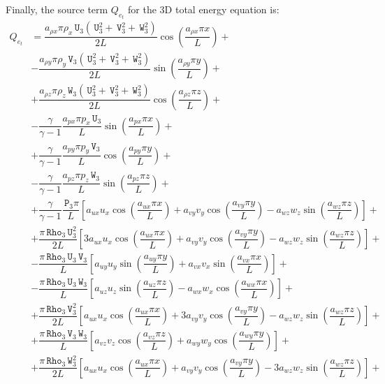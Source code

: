\documentclass[10pt]{article}
\newcommand{\Rho}{\,\mathtt{Rho}}
\newcommand{\PP}{\,\mathtt{P}}
\newcommand{\U}{\,\mathtt{U}}
\newcommand{\V}{\,\mathtt{V}}
\newcommand{\W}{\,\mathtt{W}}
\begin{document}
Finally, the source term $Q_{e_t}$ for the 3D total energy equation is:
\begin{equation}
 \begin{split}\label{eq:ns_3d_e}
Q_{e_t} &= \dfrac{a_{\rho x} \pi \rho_x \U_3 (\U_3^2+\V_3^2+\W_3^2)}{2L}\cos\left(\dfrac{a_{\rho x} \pi x}{L}\right)+\\
&- \dfrac{a_{\rho y} \pi \rho_y \V_3 (\U_3^2+\V_3^2+\W_3^2)}{2L}\sin\left(\dfrac{a_{\rho y} \pi y}{L}\right)+\\
&+  \dfrac{a_{\rho z} \pi \rho_z \W_3 (\U_3^2+\V_3^2+\W_3^2)}{2L}\cos\left(\dfrac{a_{\rho z} \pi z}{L}\right)+\\
&-\dfrac{\gamma}{\gamma-1}\dfrac{a_{px} \pi p_x  \U_3}{L}\sin\left(\dfrac{a_{px} \pi x}{L}\right) +\\
&+\dfrac{\gamma}{\gamma-1}\dfrac{a_{py} \pi p_y \V_3}{L}\cos\left(\dfrac{a_{py} \pi y}{L}\right) +\\
&-\dfrac{\gamma}{\gamma-1}\dfrac{a_{pz}\pi  p_z  \W_3}{L}\sin\left(\dfrac{a_{pz} \pi z}{L}\right) +\\
&+ \dfrac{\gamma}{\gamma-1}\dfrac{\PP_3 \pi}{L}\left[a_{ux} u_x \cos\left(\dfrac{a_{ux} \pi x}{L}\right)+a_{vy} v_y \cos\left(\dfrac{a_{vy} \pi y}{L}\right)-a_{wz} w_z \sin\left(\dfrac{a_{wz} \pi z}{L}\right)\right] +\\
&+\dfrac{\pi \Rho_3 \U_3^2}{2L}\left[3 a_{ux} u_x \cos\left(\dfrac{a_{ux} \pi x}{L}\right)+a_{vy} v_y \cos\left(\dfrac{a_{vy} \pi y}{L}\right)-a_{wz} w_z \sin\left(\dfrac{a_{wz} \pi z}{L}\right)\right]+\\
&-\dfrac{\pi \Rho_3 \U_3 \V_3}{L}\left[a_{uy} u_y \sin\left(\dfrac{a_{uy} \pi y}{L}\right)+a_{vx} v_x \sin\left(\dfrac{a_{vx} \pi x}{L}\right)\right] +\\
&-\dfrac{\pi \Rho_3 \U_3 \W_3}{L}\left[a_{uz} u_z \sin\left(\dfrac{a_{uz} \pi z}{L}\right)-a_{wx} w_x \cos\left(\dfrac{a_{wx} \pi x}{L}\right)\right] +\\
&+\dfrac{\pi \Rho_3 \V_3^2}{2L}\left[a_{ux} u_x \cos\left(\dfrac{a_{ux} \pi x}{L}\right)+3 a_{vy} v_y \cos\left(\dfrac{a_{vy} \pi y}{L}\right)-a_{wz} w_z \sin\left(\dfrac{a_{wz} \pi z}{L}\right)\right] +\\
&+ \dfrac{\pi \Rho_3 \V_3 \W_3}{L}\left[a_{vz} v_z \cos\left(\dfrac{a_{vz} \pi z}{L}\right)+a_{wy} w_y \cos\left(\dfrac{a_{wy} \pi y}{L}\right)\right]+\\
&+\dfrac{\pi \Rho_3 \W_3^2}{2L}\left[a_{ux} u_x \cos\left(\dfrac{a_{ux} \pi x}{L}\right)+a_{vy} v_y \cos\left(\dfrac{a_{vy} \pi y}{L}\right)-3 a_{wz} w_z \sin\left(\dfrac{a_{wz} \pi z}{L}\right)\right]+\\

\end{split}
\end{equation}
\end{document}
